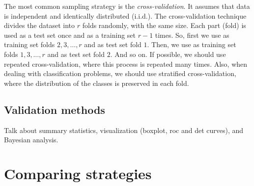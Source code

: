 The most common sampling strategy is the \emph{cross-validation}.  It assumes that data is
independent and identically distributed (i.i.d.).  The cross-validation technique divides
the dataset into $r$ folds randomly, with the same size.  Each part (fold) is used as a
test set once and as a training set $r-1$ times.  So, first we use as training set folds
$2, 3, \ldots, r$ and as test set fold $1$.  Then, we use as training set folds $1, 3,
\ldots, r$ and as test set fold $2$. And so on.  If possible, we should use repeated
cross-validation, where this process is repeated many times.  Also, when dealing with
classification problems, we should use stratified cross-validation, where the distribution
of the classes is preserved in each fold.

\subsection{Validation methods}

Talk about summary statistics, visualization (boxplot, roc and det curves), and Bayesian
analysis.

\section{Comparing strategies}

